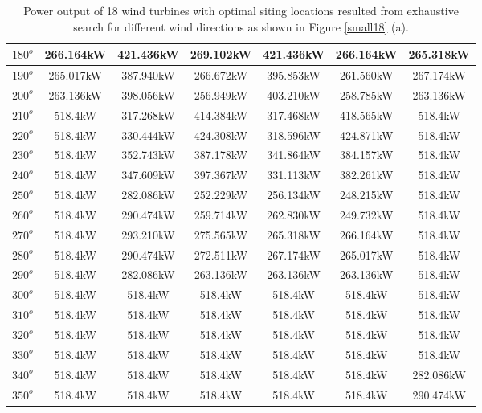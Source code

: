 \begin{table}[H]
\begin{tabular}{|c|c|c|c|c|c|c|}
		$180^o$	& 266.164kW	& 421.436kW	& 269.102kW	& 421.436kW	& 266.164kW	& 265.318kW	\\ \hline
		$190^o$	& 265.017kW	& 387.940kW	& 266.672kW	& 395.853kW	& 261.560kW	& 267.174kW	\\ \hline
		$200^o$	& 263.136kW	& 398.056kW	& 256.949kW	& 403.210kW	& 258.785kW	& 263.136kW	\\ \hline
		$210^o$	& 518.4kW	& 317.268kW	& 414.384kW	& 317.468kW	& 418.565kW	& 518.4kW	\\ \hline
		$220^o$	& 518.4kW	& 330.444kW	& 424.308kW	& 318.596kW	& 424.871kW	& 518.4kW	\\ \hline
		$230^o$	& 518.4kW	& 352.743kW	& 387.178kW	& 341.864kW	& 384.157kW	& 518.4kW	\\ \hline
		$240^o$	& 518.4kW	& 347.609kW	& 397.367kW	& 331.113kW	& 382.261kW	& 518.4kW	\\ \hline
		$250^o$	& 518.4kW	& 282.086kW	& 252.229kW	& 256.134kW	& 248.215kW	& 518.4kW	\\ \hline
		$260^o$	& 518.4kW	& 290.474kW	& 259.714kW	& 262.830kW	& 249.732kW	& 518.4kW	\\ \hline
		$270^o$	& 518.4kW	& 293.210kW	& 275.565kW	& 265.318kW	& 266.164kW	& 518.4kW	\\ \hline
		$280^o$	& 518.4kW	& 290.474kW	& 272.511kW	& 267.174kW	& 265.017kW	& 518.4kW	\\ \hline
		$290^o$	& 518.4kW	& 282.086kW	& 263.136kW	& 263.136kW	& 263.136kW	& 518.4kW	\\ \hline
		$300^o$	& 518.4kW	& 518.4kW	& 518.4kW	& 518.4kW	& 518.4kW	& 518.4kW	\\ \hline
		$310^o$	& 518.4kW	& 518.4kW	& 518.4kW	& 518.4kW	& 518.4kW	& 518.4kW	\\ \hline
		$320^o$	& 518.4kW	& 518.4kW	& 518.4kW	& 518.4kW	& 518.4kW	& 518.4kW	\\ \hline
		$330^o$	& 518.4kW	& 518.4kW	& 518.4kW	& 518.4kW	& 518.4kW	& 518.4kW	\\ \hline
		$340^o$	& 518.4kW	& 518.4kW	& 518.4kW	& 518.4kW	& 518.4kW	& 282.086kW	\\ \hline
		$350^o$	& 518.4kW	& 518.4kW	& 518.4kW	& 518.4kW	& 518.4kW	& 290.474kW	\\ \hline
        	\end{tabular}
        	\caption{Power output of 18 wind turbines with optimal siting locations resulted from exhaustive search for different wind directions as shown in Figure \ref{small18} (a).}
        	\label{table18a}
        \end{table}
